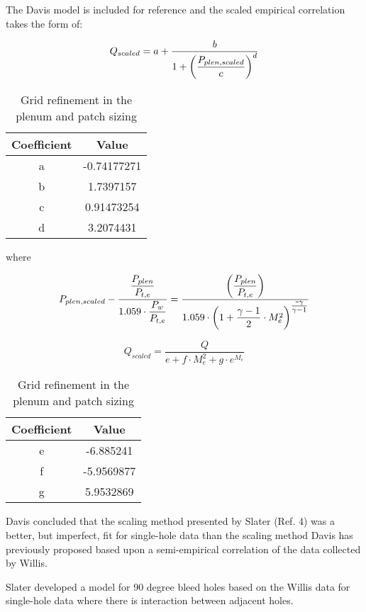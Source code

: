 The Davis model is included for reference and the scaled empirical correlation takes the form of:


$$ Q_{scaled} = a + \dfrac{b}{1+\qty(\dfrac{P_{plen,scaled}}{c})^d} $$

\begin{table}[!htbp] \centering 
\begin{tabular}[c]{*{2}{|c}|} \hline
\textbf{Coefficient} & \textbf{Value}   \\ \hline
a   & -0.74177271 \\ \hline
b   &  1.7397157  \\ \hline
c   &  0.91473254 \\ \hline
d   &  3.2074431  \\ \hline
\end{tabular} 
\caption{Grid refinement in the plenum and patch sizing} 
\label{tab:davis1} \end{table}

where 

$$ P_{plen,scaled} - \frac{\dfrac{P_{plen}}{P_{t,e}}}{1.059\cdot\dfrac{P_w}{P_{t,e}}} = \dfrac{\qty(\dfrac{P_{plen}}{P_{t,e}})}{1.059 \cdot \qty(1+\dfrac{\gamma-1}{2}\cdot M^2_e)^{\textstyle\frac{\texttt{-}\gamma}{\gamma-1}}} $$

$$ Q_{scaled} = \dfrac{Q}{e + f\cdot M_e^2 + g \cdot e^{M_e}} $$

\begin{table}[!htbp] \centering 
\begin{tabular}[c]{*{2}{|c}|} \hline
\textbf{Coefficient} & \textbf{Value}   \\ \hline
e   & -6.885241  \\ \hline
f   & -5.9569877 \\ \hline
g   &  5.9532869 \\ \hline
\end{tabular} 
\caption{Grid refinement in the plenum and patch sizing} 
\label{tab:davis2} \end{table}

Davis \cite{Davis2012} concluded that the scaling method presented by Slater (Ref. 4) was a better, but imperfect, fit for single-hole data than the scaling method Davis has previously proposed based upon a semi-empirical correlation of the data collected by Willis.


Slater \cite{Slater2009} developed a model for 90 degree bleed holes based on the Willis data for single-hole data where there is interaction between adjacent holes.


